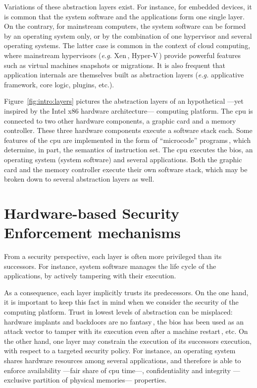 Variations of these abstraction layers exist.
%
For instance, for embedded devices, it is common that the system software and
the applications form one single layer.
%
On the contrary, for mainstream computers, the system software can be formed by
an operating system only, or by the combination of one hypervisor and several
operating systems.
%
The latter case is common in the context of cloud computing, where mainstream
hypervisors (\emph{e.g.} Xen\,\cite{barham2003xen},
Hyper-V\,\cite{velte2009hyperv}) provide powerful features such as virtual
machines snapshots or migrations.
%
It is also frequent that application internals are themselves built as
abstraction layers (\emph{e.g.} applicative framework, core logic, plugins,
etc.).

Figure~\ref{fig:intro:layers} pictures the abstraction layers of an hypothetical
---yet inspired by the Intel x86 hardware architecture--- computing platform.
%
The \ac{cpu} is connected to two other hardware components, a graphic card and a
memory controller.
%
These three hardware components execute a software stack each.
%
Some features of the \ac{cpu} are implemented in the form of ``microcode''
programs\,\cite{chen2014microcode}, which determine, in part, the semantics of
instruction set.
%
The \ac{cpu} executes the \ac{bios}, an operating system (system software) and
several applications.
%
Both the graphic card and the memory controller execute their own software
stack, which may be broken down to several abstraction layers as well.

\section{Hardware-based Security Enforcement mechanisms}

From a security perspective, each layer is often more privileged than its
successors.
%
For instance, system software manages the life cycle of the applications, by
actively tampering with their execution.

As a consequence, each layer implicitly trusts its predecessors.
%
On the one hand, it is important to keep this fact in mind when we consider the
security of the computing platform.
%
Trust in lowest levels of abstraction can be misplaced: hardware implants and
backdoors are no fantasy\,\cite{yang2016a2}, the \ac{bios} has been used as an
attack vector to tamper with its execution even after a machine
restart\,\cite{embleton2013smm}, etc.
%
On the other hand, one layer may constrain the execution of its successors
execution, with respect to a targeted security policy.
%
For instance, an operating system shares hardware resources among several
applications, and therefore is able to enforce availability ---fair share of
\ac{cpu} time---, confidentiality and integrity ---exclusive partition of
physical memories--- properties.

